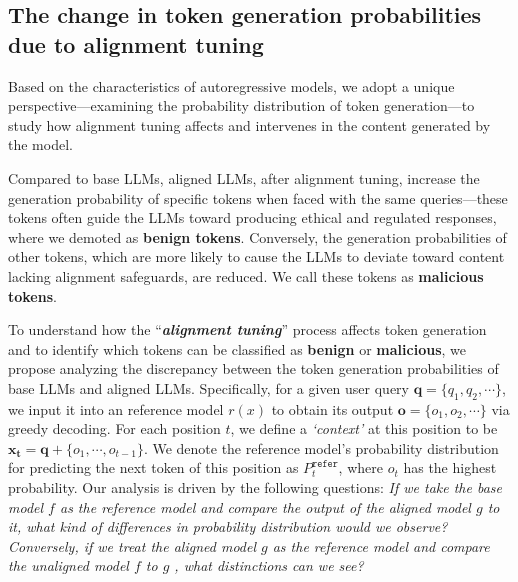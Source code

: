 \subsection{The change in token generation probabilities due to alignment tuning}
\label{ssec:tds}

Based on the characteristics of autoregressive models, we adopt a unique perspective—examining the probability distribution of token generation—to study how alignment tuning affects and intervenes in the content generated by the model.

Compared to base LLMs, aligned LLMs, after alignment tuning, increase the generation probability of specific tokens when faced with the same queries—these tokens often guide the LLMs toward producing ethical and regulated responses, where we demoted as \textbf{\color{myblue} benign tokens}. 
Conversely, the generation probabilities of other tokens, which are more likely to cause the LLMs to deviate toward content lacking alignment safeguards, are reduced.
We call these tokens as \textbf{\color{myred} malicious tokens}.

To understand how the ``\textit{\textbf{alignment tuning}}'' process affects token generation and to identify which tokens can be classified as \textbf{\color{myblue} benign} or \textbf{\color{myred} malicious}, we propose analyzing the discrepancy between the token generation probabilities of base LLMs and aligned LLMs.
%
Specifically, for a given user query $\mathbf{q}=\{q_1, q_2, \cdots\}$, 
we input it into an reference model $r(x)$ to obtain its output $\mathbf{o}=\{o_1, o_2, \cdots\}$ via greedy decoding. 
For each position $t$, we define a \textit{`context'} at this position to be $\mathbf{x_t}=\mathbf{q}+\{o_1, \cdots, o_{t-1}\}$. 
We denote the reference model's probability distribution for predicting the next token of this position as $P_{t}^{\texttt{refer}}$, where $o_t$ has the highest probability.  
Our analysis is driven by the following questions: \textit{If we take the base model $f$ as the reference model and compare the output of the aligned model $g$ to it, what kind of differences in probability distribution would we observe? Conversely, if we treat the aligned model $g$ as the reference model and compare the unaligned model $f$ to $g$ , what distinctions can we see?}

